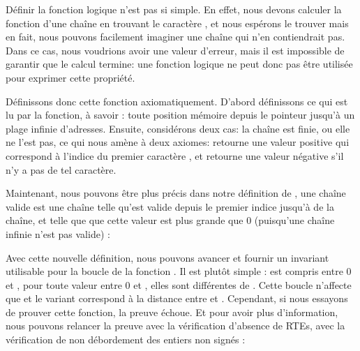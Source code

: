 


Définir la fonction logique  n'est pas si simple. En effet,
nous devons calculer la fonction d'une chaîne en trouvant le caractère
, et nous espérons le trouver mais en fait,
nous pouvons facilement imaginer une chaîne qui n'en contiendrait pas. Dans
ce cas, nous voudrions avoir une valeur d'erreur, mais il est impossible de
garantir que le calcul termine: une fonction logique ne peut donc pas être
utilisée pour exprimer cette propriété.



Définissons donc cette fonction axiomatiquement. D'abord définissons ce qui
est lu par la fonction, à savoir : toute position mémoire depuis le pointeur
jusqu'à un plage infinie d'adresses. Ensuite, considérons deux cas: la chaîne
est finie, ou elle ne l'est pas, ce qui nous amène à deux axiomes:
 retourne une valeur positive qui correspond à l'indice
du premier caractère , et retourne une valeur
négative s'il n'y a pas de tel caractère.






Maintenant, nous pouvons être plus précis dans notre définition de
, une chaîne valide est une
chaîne telle qu'est valide depuis le premier indice jusqu'à 
de la chaîne, et telle que que cette valeur est plus grande que 0 (puisqu'une
chaîne infinie n'est pas valide) :




Avec cette nouvelle définition, nous pouvons avancer et fournir un invariant
utilisable pour la boucle de la fonction . Il est plutôt
simple :  est compris entre 0 et , pour
toute valeur entre 0 et , elles sont différentes de
. Cette boucle n'affecte que 
et le variant correspond à la distance entre  et
. Cependant, si nous essayons de prouver cette fonction,
la preuve échoue. Et pour avoir plus d'information, nous pouvons relancer la
preuve avec la vérification d'absence de RTEs, avec la vérification de non
débordement des entiers non signés :



